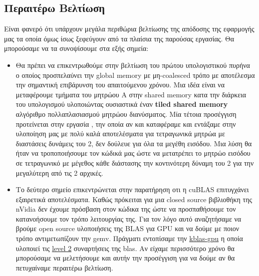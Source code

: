 \subsection*{Περαιτέρω Βελτίωση}

\noindent Είναι φανερό ότι υπάρχουν μεγάλα περιθώρια βελτίωσης της απόδοσης της εφαρμογής μας τα οποία όμως ίσως ξεφεύγουν από τα πλαίσια της παρούσας εργασίας. Θα μπορούσαμε να τα συνοψίσουμε στα εξής σημεία:

\begin{itemize}
    \item Θα πρέπει να επικεντρωθούμε στην βελτίωση του πρώτου υπολογιστικού πυρήνα ο οποίος προσπελαύνει την global memory με μη-coalesced τρόπο με αποτέλεσμα την σημαντική επιβάρυνση του απαιτούμενου χρόνου. Μια ιδέα είναι να μεταφέρουμε τμήματα του μητρώου Α στην shared memory κατα την διάρκεια του υπολογισμού υλοποιώντας ουσιαστικά έναν \textbf{tiled shared memory} αλγόριθμο πολλαπλασιασμού μητρώου διανύσματος. Μία τέτοια προσέγγιση προτείνεται στην εργασία \cite{Erik:tiled}, την οποία αν και καταφέραμε και εντάξαμε στην υλοποίηση μας με πολύ καλά αποτελέσματα για τετραγωνικά μητρώα με διαστάσεις δυνάμεις του 2, δεν δούλευε για όλα τα μεγέθη εισόδου. Μια λύση θα ήταν να τροποποιήσουμε τον κώδικά μας ώστε να μετατρέπει το μητρώο εισόδου σε τετραγωνικό με μέγεθος κάθε διάστασης την κοντινότερη δύναμη του 2 για την μεγαλύτερη από τις 2 αρχικές.
    
    \item Το δεύτερο σημείο επικεντρώνεται στην παρατήρηση οτι η cuBLAS επιτυγχάνει εξαιρετικά αποτελέσματα. Καθώς πρόκειται για μια closed source βιβλιοθήκη της nVidia δεν έχουμε πρόσβαση στον κώδικα της ώστε να προσπαθήσουμε τον κατανοήσουμε τον τρόπο λειτουργίας της. Για τον λόγο αυτό αναζητήσαμε να βρούμε open source υλοποιήσεις της BLAS για GPU και να δούμε με ποιον τρόπο αντιμετωπίζουν την gemv. Πράγματι εντοπίσαμε την \href{https://github.com/ecrc/kblas-gpu/}{kblas-gpu} η οποία υλοποιεί τις \href{https://github.com/ecrc/kblas-gpu/tree/master/src/blas_l2}{level 2} συναρτήσεις της blas. Αν είχαμε περισσότερο χρόνο θα μπορούσαμε να μελετήσουμε και αυτήν την προσέγγιση για να δούμε αν θα πετυχαίναμε περαιτέρω βελτίωση.
    
\end{itemize}




\newpage